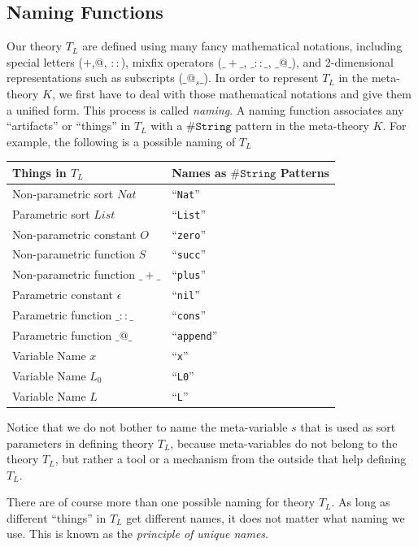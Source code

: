 \documentclass[UTF8,11pt]{article}
\theoremstyle{plain}
\theoremstyle{definition}
\theoremstyle{remark}
\newcommand{\Nat}{\textit{Nat}}
\newcommand{\List}{\textit{List}}
\newcommand{\sharpsymbol}{\#}
\newcommand{\KString}{\texttt{\sharpsymbol String}}
\newcommand{\qquottt}[1]{\textrm{``\texttt{#1}''}}
\begin{document}
\subsection{Naming Functions}
Our theory $T_L$ are defined using many fancy mathematical notations, including
special letters ($+$,$@$, $::$), mixfix operators ($\_+\_$, $\_::\_$, $\_@\_$), 
and 2-dimensional representations such as subscripts ($\_@_s\_$).
In order to represent $T_L$ in the meta-theory $K$, we first have to deal with 
those mathematical notations and give them a unified form. 
This process is called \emph{naming}.
A naming function associates any ``artifacts'' or ``things'' in $T_L$ with a 
$\KString$ pattern in the meta-theory $K$.
For example, the following is a possible naming of $T_L$
\begin{center}
	\begin{tabular}{l|l}
		\textbf{Things in $T_L$} & \textbf{Names as $\KString$ Patterns}
		\\\hline
		Non-parametric sort $\Nat$ & \qquottt{Nat}
		\\\hline
		Parametric sort $\List$ & \qquottt{List}
		\\\hline
		Non-parametric constant $O$ & \qquottt{zero}
		\\\hline
		Non-parametric function $S$ & \qquottt{succ}
		\\\hline
		Non-parametric function $\_+\_$ & \qquottt{plus}
		\\\hline
		Parametric constant $\epsilon$ & \qquottt{nil}
		\\\hline
		Parametric function $\_::\_$ & \qquottt{cons}
		\\\hline
	    Parametric function $\_@\_$ & \qquottt{append}
	    \\\hline
	    Variable Name $x$ & \qquottt{x}
	    \\\hline
	    Variable Name $L_0$ & \qquottt{L0}
	    \\\hline
	    Variable Name $L$ & \qquottt{L}
	\end{tabular}
	\label{tab:naming}
\end{center}
Notice that we do not bother to name the meta-variable $s$ that is used as sort 
parameters in defining theory $T_L$, because meta-variables do not 
belong to the theory $T_L$, but rather a tool or a mechanism from the 
outside that help defining $T_L$.

There are of course more than one possible naming for theory $T_L$.
As long as different ``things'' in $T_L$ get different names, it does not 
matter what naming we use.
This is known as the \emph{principle of unique names}.
\end{document}
